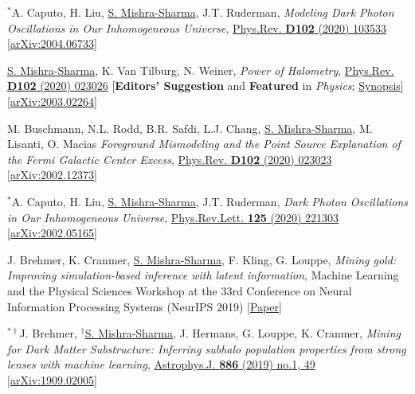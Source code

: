 \documentclass[letterpaper,11pt]{article}
\newenvironment{packed_enumerate}[1][]{
\begin{etaremune}[#1]
  \setlength{\itemsep}{3.7pt}
  \setlength{\parskip}{0pt}
  \setlength{\parsep}{0pt}}{\end{etaremune}
}
\begin{document}
\begin{packed_enumerate}[start=43]
  \item $^*$A. Caputo, H. Liu, \underline{S. Mishra-Sharma}, J.T. Ruderman, \emph{Modeling Dark Photon Oscillations in Our Inhomogeneous Universe}, \href{https://journals.aps.org/prd/abstract/10.1103/PhysRevD.102.103533}{Phys.Rev. \textbf{D102} (2020) 103533}   \href{https://arxiv.org/abs/2004.06733}{[arXiv:2004.06733]}

  \item \underline{S. Mishra-Sharma}, K. Van Tilburg, N. Weiner, \emph{Power of Halometry}, \href{https://journals.aps.org/prd/abstract/10.1103/PhysRevD.102.023026}{Phys.Rev. \textbf{D102} (2020) 023026} [\textbf{Editors' Suggestion} and \textbf{Featured} in \emph{Physics}; \href{https://physics.aps.org/articles/v13/s98}{Synopsis}]  \href{https://arxiv.org/abs/2003.02264}{[arXiv:2003.02264]}

  \item M. Buschmann, N.L. Rodd, B.R. Safdi, L.J. Chang, \underline{S. Mishra-Sharma}, M. Lisanti, O. Macias \emph{Foreground Mismodeling and the Point Source Explanation of the Fermi Galactic Center Excess},  \href{https://journals.aps.org/prd/abstract/10.1103/PhysRevD.102.023023}{Phys.Rev. \textbf{D102} (2020) 023023} \href{https://arxiv.org/abs/2002.12373}{[arXiv:2002.12373]} 

  \item $^*$A. Caputo, H. Liu, \underline{S. Mishra-Sharma}, J.T. Ruderman, \emph{Dark Photon Oscillations in Our Inhomogeneous Universe}, \href{https://journals.aps.org/prl/abstract/10.1103/PhysRevLett.125.221303}{Phys.Rev.Lett. \textbf{125} (2020) 221303}  \href{https://arxiv.org/abs/2002.05165}{[arXiv:2002.05165]}

  \item J. Brehmer, K. Cranmer, \underline{S. Mishra-Sharma}, F. Kling, G. Louppe, \emph{Mining gold: Improving simulation-based inference with latent information}, {Machine Learning and the Physical Sciences Workshop at the 33rd Conference on Neural Information Processing Systems (NeurIPS 2019)} \href{https://ml4physicalsciences.github.io/files/NeurIPS_ML4PS_2019_16.pdf}{[Paper]}

  \item $^{*\dagger}$J. Brehmer, $^\dagger$\underline{S. Mishra-Sharma}, J. Hermans, G. Louppe, K. Cranmer, \emph{Mining for Dark Matter Substructure: Inferring subhalo population properties from strong lenses with machine learning}, \href{https://iopscience.iop.org/article/10.3847/1538-4357/ab4c41}{Astrophys.J. \textbf{886} (2019) no.1, 49} \href{https://arxiv.org/abs/1909.02005}{[arXiv:1909.02005]}


\end{packed_enumerate}
\end{document}
